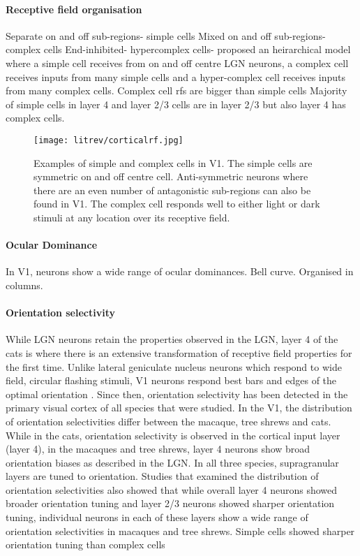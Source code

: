 \paragraph{Receptive field organisation}

Separate on and off sub-regions- simple cells
Mixed on and off sub-regions- complex cells
End-inhibited- hypercomplex cells- proposed an heirarchical model where a simple cell receives from on and off centre LGN neurons, a complex cell receives inputs from many simple cells and a hyper-complex cell receives inputs from many complex cells. 
Complex cell rfs are bigger than simple cells
Majority of simple cells in layer 4 and layer 2/3 cells are in layer 2/3 but also layer 4 has complex cells.

\begin{figure}[H]
	
	\texttt{[image: litrev/corticalrf.jpg]}
	\centering
	\caption{Examples of simple and complex cells in V1. The simple cells are symmetric on and off centre cell. Anti-symmetric neurons where there are an even number of antagonistic sub-regions can also be found in V1. The complex cell responds well to either light or dark stimuli at any location over its receptive field.}
	
	\label{fig:rforgV1}
\end{figure}

\paragraph{Ocular Dominance}
In V1, neurons show a wide range of ocular dominances. Bell curve. Organised in columns.

\paragraph{Orientation selectivity}

While LGN neurons retain the properties observed in the LGN, layer 4 of the cats is where there is an extensive transformation of receptive field properties for the first time. Unlike lateral geniculate nucleus neurons which respond to wide field, circular flashing stimuli, V1 neurons respond best bars and edges of the optimal orientation \cite{Hubel1962d}. Since then, orientation selectivity has been detected in the primary visual cortex of all species that were studied. In the V1, the distribution of orientation selectivities differ between the macaque, tree shrews and cats. While in the cats, orientation selectivity is observed in the cortical input layer (layer 4), in the macaques and tree shrews, layer 4 neurons show broad orientation biases as described in the LGN. In all three species, supragranular layers are tuned to orientation. Studies that examined the distribution of orientation selectivities also showed that while overall layer 4 neurons showed broader orientation tuning and layer 2/3 neurons showed sharper orientation tuning, individual neurons in each of these layers show a wide range of orientation selectivities in macaques and tree shrews. Simple cells showed sharper orientation tuning than complex cells \cite{Henry1974}

